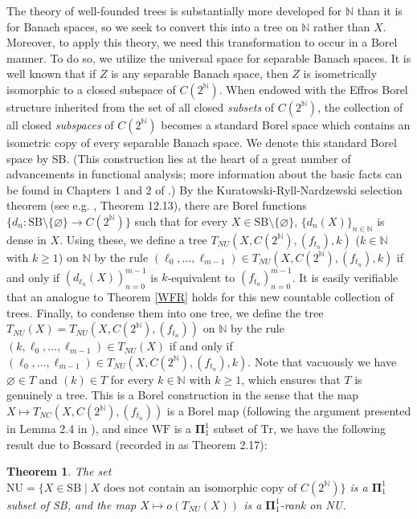 \documentclass{article}
\newtheorem{theorem}{Theorem}
\newcommand{\N}{\mathbb N}
\begin{document}
The theory of well-founded trees is substantially more developed for $\N$ than it is for Banach spaces, so we seek to convert this into a tree on $\N$ rather than $X$. Moreover, to apply this theory, we need this transformation to occur in a Borel manner. To do so, we utilize the universal space for separable Banach spaces. It is well known that if $Z$ is any separable Banach space, then $Z$ is isometrically isomorphic to a closed subspace of $C(2^\N)$. When endowed with the Effros Borel structure inherited from the set of all closed \textit{subsets} of $C(2^\N)$, the collection of all closed \textit{subspaces} of $C(2^\N)$ becomes a standard Borel space which contains an isometric copy of every separable Banach space. We denote this standard Borel space by SB. (This construction lies at the heart of a great number of advancements in functional analysis; more information about the basic facts can be found in Chapters 1 and 2 of \cite{D}.) By the Kuratowski-Ryll-Nardzewski selection theorem (see e.g. \cite{K}, Theorem 12.13), there are Borel functions $\{d_n : \text{SB}\setminus\{\varnothing\}\rightarrow C(2^\N)\}$ such that for every $X\in \text{SB}\setminus\{\varnothing\}$, $\{d_n(X)\}_{n\in\N}$ is dense in $X$. Using these, we define a tree $T_{NU}(X,C(2^\N),(f_{t_n}),k)$ ($k\in\N$ with $k\geq 1$) on $\N$ by the rule $(\ell_0,\ldots,\ell_{m-1})\in T_{NU}(X,C(2^\N),(f_{t_n}),k)$ if and only if $(d_{\ell_n}(X))_{n=0}^{m-1}$ is $k$-equivalent to $(f_{t_n})_{n=0}^{m-1}$. It is easily verifiable that an analogue to Theorem \ref{WFR} holds for this new countable collection of trees. Finally, to condense them into one tree, we define the tree $T_{NU}(X) = T_{NU}(X,C(2^\N), (f_{t_n}))$ on $\N$ by the rule $(k,\ell_0,\ldots, \ell_{m-1})\in T_{NU}(X)$ if and only if $(\ell_0,\ldots, \ell_{m-1})\in T_{NU}(X,C(2^\N), (f_{t_n}), k)$. Note that vacuously we have $\varnothing\in T$ and $(k)\in T$ for every $k\in\N$ with $k\geq 1$, which ensures that $T$ is genuinely a tree. This is a Borel construction in the sense that the map $X\mapsto T_{NC}(X, C(2^\N), (f_{t_n}))$ is a Borel map (following the argument presented in Lemma 2.4 in \cite{D}), and since $\text{WF}$ is a $\boldsymbol\Pi_1^1$ subset of $\text{Tr}$, we have the following result due to Bossard (recorded in \cite{D} as Theorem 2.17):

\begin{theorem}\label{WFN}
The set $\text{NU} = \{X\in\text{SB}\mid X\text{ does not contain an isomorphic copy of $C(2^\N)$}\}$ is a $\boldsymbol\Pi_1^1$ subset of SB, and the map $X\mapsto o(T_{NU}(X))$ is a $\boldsymbol\Pi_1^1$-rank on NU.
\end{theorem}
\end{document}
